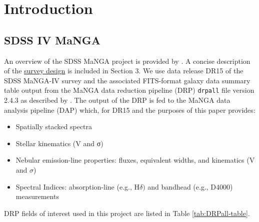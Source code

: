 \section{Introduction}
\label{sec:introduction}



\subsection{SDSS IV MaNGA}
An overview of the SDSS MaNGA project is provided by \citet{2015ApJ...798....7B}. A concise description of the \href{https://iopscience.iop.org/article/10.1088/0004-637X/798/1/7/meta#apj504473s3}{survey design} is included in Section 3. We use data release DR15 of the SDSS MaNGA-IV survey \citep{2019ApJS..240...23A} and the associated FITS-format galaxy data summary table output from the MaNGA data reduction pipeline (DRP) \texttt{drpall} file version 2.4.3 as described by \citet{2016AJ....152...83L}. The output of the DRP is fed to the MaNGA data analysis pipeline (DAP) which, for DR15 and the purposes of this paper provides:
\begin{itemize}
    \item Spatially stacked spectra
    \item Stellar kinematics (V and σ)
    \item Nebular emission-line properties: fluxes, equivalent widths, and kinematics (V and $\sigma$)
    \item Spectral Indices: absorption-line (e.g., H$\delta)$ and bandhead (e.g., D4000) measurements
\end{itemize}

DRP fields of interest used in this project are listed in Table \ref{tab:DRPall-table}.


